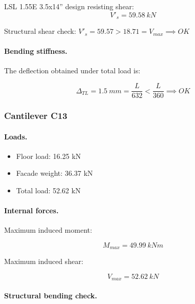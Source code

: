 \noindent LSL 1.55E 3.5x14'' design resisting shear:
\begin{equation}
  V'_s= 59.58\ kN
\end{equation}

\noindent Structural shear check: $V'_s = 59.57 > 18.71 = V_{max} \implies OK$

\paragraph{Bending stiffness.}
The deflection obtained under total load is:

\begin{equation}
  \Delta_{TL}= 1.5\ mm= \frac{L}{632} < \frac{L}{360} \implies OK
\end{equation}

\subsubsection{Cantilever C13}

\paragraph{Loads.}

\begin{itemize}
\item Floor load: 16.25 kN
\item Facade weight: 36.37 kN
\item Total load: 52.62 kN
\end{itemize}

\paragraph{Internal forces.}

\noindent Maximum induced moment:

\begin{equation}
  M_{max}= 49.99\ kN m
\end{equation}

\noindent Maximum induced shear:

\begin{equation}
  V_{max}= 52.62\ kN
\end{equation}

\paragraph{Structural bending check.}

